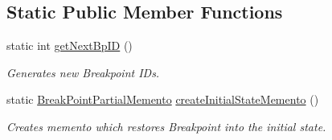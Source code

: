 \subsection*{Static Public Member Functions}
\begin{DoxyCompactItemize}
\item 
static int \hyperlink{classgov_1_1nasa_1_1jpf_1_1inspector_1_1server_1_1breakpoints_1_1_internal_breakpoint_holder_a6e05b8e366e8f0394cd3be50bb51b7c9}{get\+Next\+Bp\+ID} ()
\begin{DoxyCompactList}\small\item\em Generates new Breakpoint I\+Ds. \end{DoxyCompactList}\item 
static \hyperlink{interfacegov_1_1nasa_1_1jpf_1_1inspector_1_1server_1_1breakpoints_1_1_break_point_handler_1_1_break_point_partial_memento}{Break\+Point\+Partial\+Memento} \hyperlink{classgov_1_1nasa_1_1jpf_1_1inspector_1_1server_1_1breakpoints_1_1_internal_breakpoint_holder_a8f7e0ef9a6c26a87ef52c0319a3f7c98}{create\+Initial\+State\+Memento} ()
\begin{DoxyCompactList}\small\item\em Creates memento which restores Breakpoint into the initial state. \end{DoxyCompactList}\end{DoxyCompactItemize}
